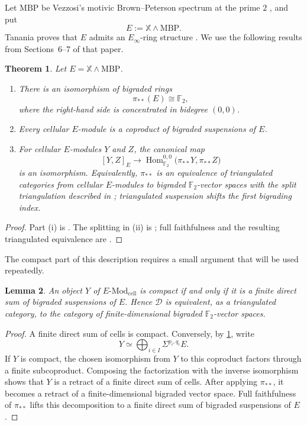 \documentclass[11pt]{amsart}
\numberwithin{equation}{section}
\newtheorem{theorem}{Theorem}[section]
\newtheorem{lemma}[theorem]{Lemma}
\theoremstyle{definition}
\theoremstyle{remark}
\DeclareMathOperator{\Hom}{Hom}
\newcommand{\MBP}{\mathrm{MBP}}
\newcommand{\F}{\mathbb F_2}
\newcommand{\X}{\mathbb X}
\newcommand{\D}{\mathcal D}
\newcommand{\cell}{\mathrm{cell}}
\newcommand{\Mod}{\mathrm{Mod}}
\begin{document}
Let $\MBP$ be Vezzosi's motivic Brown--Peterson spectrum at the prime $2$
\cite{VezzosiMBP}, and put
\[
  E:=\X\wedge\MBP.
\]
Tanania proves that $E$ admits an $E_\infty$-ring structure
\cite[Proposition~7.1]{TananiaCellular}.  We use the following 
results from Sections~6--7 of that paper.

\begin{theorem}\label{thm:tanania-input}
Let $E=\X\wedge\MBP$.
\begin{enumerate}[label=\textup{(\roman*)}]
\item There is an isomorphism of bigraded rings
\[
  \pi_{**}(E)\cong\F,
\]
where the right-hand side is concentrated in bidegree $(0,0)$.
\item Every cellular $E$-module is a coproduct of bigraded suspensions of
$E$.
\item For cellular $E$-modules $Y$ and $Z$, the canonical map
\[
  [Y,Z]_E\longrightarrow
  \Hom_{\F}^{0,0}\bigl(\pi_{**}Y,\pi_{**}Z\bigr)
\]
is an isomorphism.  Equivalently, $\pi_{**}$ is an equivalence of
triangulated categories from cellular $E$-modules to bigraded
$\F$-vector spaces with the split triangulation described in
\cite[Remark~7.5]{TananiaCellular}; triangulated suspension shifts the first
bigrading index.
\end{enumerate}
\end{theorem}

\begin{proof}
Part (i) is \cite[Theorem~6.6]{TananiaCellular}.  The splitting in (ii) is
\cite[Proposition~7.2]{TananiaCellular}; full faithfulness and the resulting
triangulated equivalence are \cite[Corollary~7.3, Theorem~7.4 and
Remark~7.5]{TananiaCellular}.
\end{proof}

The compact part of this description requires a small argument that will be
used repeatedly.

\begin{lemma}\label{lem:compact-E-modules}
An object $Y$ of $E\text{-}\Mod_{\cell}$ is compact if and only if it is a
finite direct sum of bigraded suspensions of $E$.  Hence $\D$ is equivalent,
as a triangulated category, to the category of finite-dimensional bigraded
$\F$-vector spaces.
\end{lemma}

\begin{proof}
A finite direct sum of cells is compact.  Conversely, by
\cref{thm:tanania-input}, write
\[
  Y\simeq\bigoplus_{i\in I}\Sigma^{p_i,q_i}E.
\]
If $Y$ is compact, the chosen isomorphism from $Y$ to this coproduct factors
through a finite subcoproduct.  Composing the factorization with the inverse
isomorphism shows that $Y$ is a retract of a finite direct sum of cells.
After applying $\pi_{**}$, it becomes a retract of a finite-dimensional
bigraded vector space.  Full
faithfulness of $\pi_{**}$ lifts this decomposition to a finite direct sum of
bigraded suspensions of $E$.
\end{proof}
\end{document}
